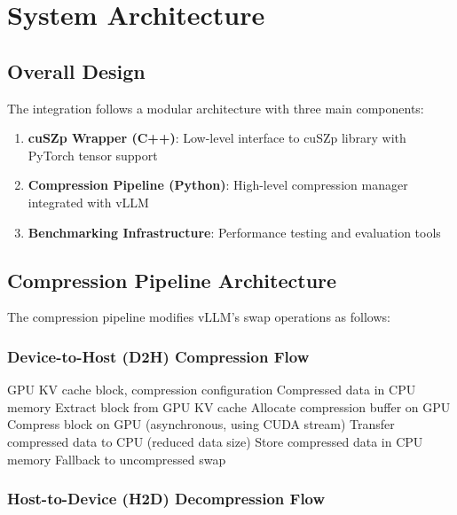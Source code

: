 \documentclass{polyu-comp}
\begin{document}
\chapter{System Architecture}

\section{Overall Design}
The integration follows a modular architecture with three main components:

\begin{enumerate}
    \item \textbf{cuSZp Wrapper (C++)}: Low-level interface to cuSZp library with PyTorch tensor support
    \item \textbf{Compression Pipeline (Python)}: High-level compression manager integrated with vLLM
    \item \textbf{Benchmarking Infrastructure}: Performance testing and evaluation tools
\end{enumerate}

\section{Compression Pipeline Architecture}

The compression pipeline modifies vLLM's swap operations as follows:

\subsection{Device-to-Host (D2H) Compression Flow}

\begin{algorithm}[H]
\caption{D2H Compressed Swap}
\begin{algorithmic}[1]
\REQUIRE GPU KV cache block, compression configuration
\ENSURE Compressed data in CPU memory
\STATE Extract block from GPU KV cache
\STATE Allocate compression buffer on GPU
\STATE Compress block on GPU (asynchronous, using CUDA stream)
\STATE Transfer compressed data to CPU (reduced data size)
\STATE Store compressed data in CPU memory
    \STATE Fallback to uncompressed swap
\ENDIF
\end{algorithmic}
\end{algorithm}

\subsection{Host-to-Device (H2D) Decompression Flow}
\end{document}
